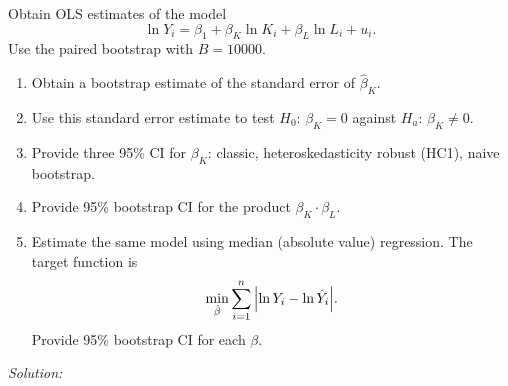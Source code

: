 \documentclass[12pt]{article}
\newcommand{\1}{\mathbbm{I}}
\begin{document}
Obtain OLS estimates of the model 
\[
\ln Y_i = \beta_1 + \beta_K \ln K_i + \beta_L \ln L_i  + u_i.
\] 
Use the paired bootstrap with $B = 10000$.

\begin{enumerate}
	\item Obtain a bootstrap estimate of the standard error of $\hat \beta_K$. 
	
	\item Use this standard error estimate to test $H_0$: $\beta_K = 0$ against $H_a$: $\beta_K \neq 0$.
	
	\item Provide three 95\% CI for $\beta_K$: classic, heteroskedasticity robust (HC1), naive bootstrap.
	
	\item Provide 95\% bootstrap CI for the product $\beta_K \cdot \beta_L$.
	
	\item Estimate the same model using median (absolute value) regression. 
	The target function is 
	\[
	\min_{\hat\beta} \sum_{i=1}^n \abs{\ln Y_i  - \ln \hat Y_i}.
	\]
	Provide 95\% bootstrap CI for each $\beta$. 

\end{enumerate}







\begin{teacher}
	
\textit{Solution:} 

	
\end{teacher}
\end{document}

